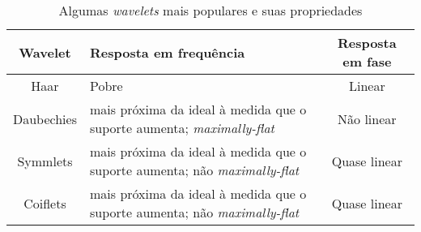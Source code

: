 \begin{table}[h]
	\centering
	\begin{tabular}{|c|p{75mm}|c|}
			\hline 
			\textbf{Wavelet} & \textbf{Resposta em frequência} & \textbf{Resposta em fase} \\ 
			\hline 
			Haar & Pobre &  Linear \\ 
			\hline 
			Daubechies & mais próxima da ideal à medida que o \newline  suporte aumenta; \textit{maximally-flat}  &  Não linear \\ 
			\hline 
			Symmlets & mais próxima da ideal à medida que o \newline  suporte aumenta; não \textit{maximally-flat}  & Quase linear \\ 
			\hline 
			Coiflets & mais próxima da ideal à medida que o \newline  suporte aumenta; não \textit{maximally-flat}  & Quase linear \\ 
			\hline 
	\end{tabular} 
	\caption{Algumas \textit{wavelets} mais populares e suas propriedades}
	\label{tab:waveletsProperties}
\end{table}
